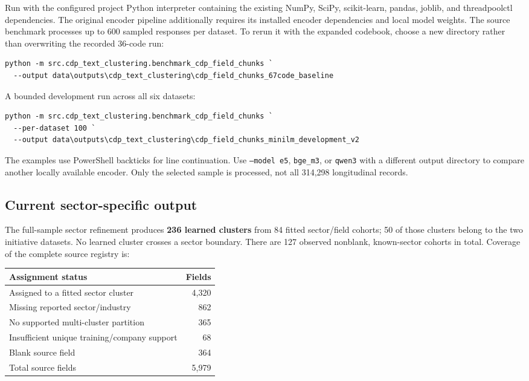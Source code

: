\documentclass[11pt,a4paper]{article}
\begin{document}
Run with the configured project Python interpreter containing the existing
NumPy, SciPy, scikit-learn, pandas, joblib, and threadpoolctl dependencies.
The original encoder pipeline additionally requires its installed encoder
dependencies and local model weights. The source benchmark processes up to
600 sampled responses per dataset. To rerun it with the expanded codebook,
choose a new directory rather than overwriting the recorded 36-code run:
\begin{verbatim}
python -m src.cdp_text_clustering.benchmark_cdp_field_chunks `
  --output data\outputs\cdp_text_clustering\cdp_field_chunks_67code_baseline
\end{verbatim}
A bounded development run across all six datasets:
\begin{verbatim}
python -m src.cdp_text_clustering.benchmark_cdp_field_chunks `
  --per-dataset 100 `
  --output data\outputs\cdp_text_clustering\cdp_field_chunks_minilm_development_v2
\end{verbatim}
The examples use PowerShell backticks for line continuation.
Use \texttt{--model e5}, \texttt{bge\_m3}, or \texttt{qwen3} with a
different output directory to compare another locally available encoder.
Only the selected sample is processed, not all 314,298 longitudinal records.

\subsection{Current sector-specific output}
The full-sample sector refinement produces \textbf{236 learned clusters}
from 84 fitted sector/field cohorts; 50 of those clusters belong to the two
initiative datasets. No learned cluster crosses a sector boundary.
There are 127 observed nonblank, known-sector cohorts in total.
Coverage of the complete source registry is:

\begin{center}
\begin{tabular}{lr}
Assignment status & Fields \\
\hline
Assigned to a fitted sector cluster & 4,320 \\
Missing reported sector/industry & 862 \\
No supported multi-cluster partition & 365 \\
Insufficient unique training/company support & 68 \\
Blank source field & 364 \\
\hline
Total source fields & 5,979
\end{tabular}
\end{center}
\end{document}
